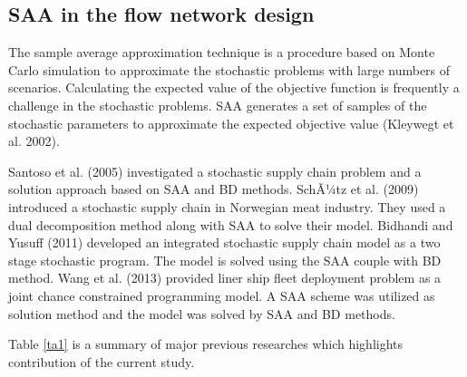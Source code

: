 \documentclass[review]{elsarticle}
\begin{document}
\subsection{SAA in the flow network design}

The sample average approximation technique is a procedure based on Monte Carlo simulation to approximate the stochastic problems with large numbers of scenarios. Calculating the expected value of the objective function is frequently a challenge in the stochastic problems. SAA generates a set of samples of the stochastic parameters to approximate the expected objective value (Kleywegt et al. 2002). 

Santoso et al. (2005) investigated a stochastic supply chain problem and a solution approach based on SAA and BD methods. SchÃ¼tz et al. (2009) introduced a stochastic supply chain in Norwegian meat industry. They used a dual decomposition method along with SAA to solve their model. Bidhandi and Yusuff (2011) developed an integrated stochastic supply chain model as a two stage stochastic program. The model is solved using the SAA couple with BD method. Wang et al. (2013) provided liner ship fleet deployment problem as a joint chance constrained programming model. A SAA scheme was utilized as solution method and the model was solved by SAA and BD methods. 

Table \ref{ta1} is a summary of major previous researches which highlights contribution of the current study. 
\end{document}
